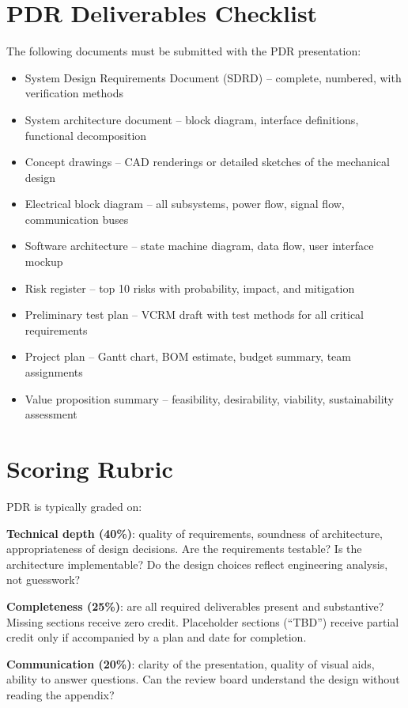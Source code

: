 \section{PDR Deliverables Checklist}
The following documents must be submitted with the PDR presentation:

\begin{itemize}[nosep,leftmargin=1.5em]
\item System Design Requirements Document (SDRD) -- complete, numbered, with verification methods
\item System architecture document -- block diagram, interface definitions, functional decomposition
\item Concept drawings -- CAD renderings or detailed sketches of the mechanical design
\item Electrical block diagram -- all subsystems, power flow, signal flow, communication buses
\item Software architecture -- state machine diagram, data flow, user interface mockup
\item Risk register -- top 10 risks with probability, impact, and mitigation
\item Preliminary test plan -- VCRM draft with test methods for all critical requirements
\item Project plan -- Gantt chart, BOM estimate, budget summary, team assignments
\item Value proposition summary -- feasibility, desirability, viability, sustainability assessment
\end{itemize}

\section{Scoring Rubric}
PDR is typically graded on:

\textbf{Technical depth (40\%)}: quality of requirements, soundness of architecture, appropriateness of design decisions. Are the requirements testable? Is the architecture implementable? Do the design choices reflect engineering analysis, not guesswork?

\textbf{Completeness (25\%)}: are all required deliverables present and substantive? Missing sections receive zero credit. Placeholder sections (``TBD'') receive partial credit only if accompanied by a plan and date for completion.

\textbf{Communication (20\%)}: clarity of the presentation, quality of visual aids, ability to answer questions. Can the review board understand the design without reading the appendix?


